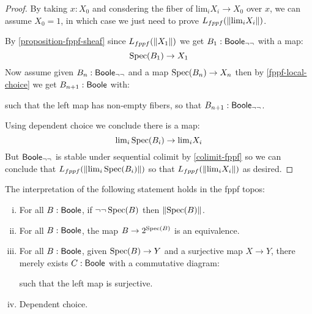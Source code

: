 \begin{proof}
By taking $x:X_0$ and consdering the fiber of $\mathrm{lim}_i X_i\to X_0$ over $x$, we can assume $X_0=1$, in which case we just need to prove $L_{fppf}(\lVert \mathrm{lim}_iX_i \rVert)$.

By \cref{proposition-fppf-sheaf} since $L_{fppf}(\lVert X_1 \rVert)$ we get $B_1:\mathsf{Boole}_{\neg\neg}$ with a map:
\[\operatorname{Spec}(B_1)\to X_1\]
Now assume given $B_n:\mathsf{Boole}_{\neg\neg}$ and a map $\operatorname{Spec}(B_n)\to X_n$ then by \cref{fppf-local-choice} we get $B_{n+1}:\mathsf{Boole}$ with:
\begin{center}
\end{center}
such that the left map has non-empty fibers, so that $B_{n+1}:\mathsf{Boole}_{\neg\neg}$.

Using dependent choice we conclude there is a map:
\[\mathrm{lim}_i\operatorname{Spec}(B_i) \to \mathrm{lim}_iX_i\]
But $\mathsf{Boole}_{\neg\neg}$ is stable under sequential colimit by \cref{colimit-fppf} so we can conclude that $L_{fppf}(\lVert \mathrm{lim}_i\operatorname{Spec}(B_i) \rVert)$ so that $L_{fppf}(\lVert \mathrm{lim}_iX_i \rVert)$ as desired.
\end{proof}

\begin{theorem}
The interpretation of the following statement holds in the fppf topos:
\begin{enumerate}[(i)]
\item For all $B:\mathsf{Boole}$, if $\neg\neg\operatorname{Spec}(B)$ then $\lVert \operatorname{Spec}(B) \rVert$.
\item For all $B:\mathsf{Boole}$, the map $B\to {2}^{\operatorname{Spec}(B)}$ is an equivalence.
\item For all $B:\mathsf{Boole}$, given $\operatorname{Spec}(B)\to Y$ and a surjective map $X\to Y$, there merely exists $C:\mathsf{Boole}$ with a commutative diagram:
\begin{center}
\end{center}
such that the left map is surjective.
\item Dependent choice.
\end{enumerate}
\end{theorem}

